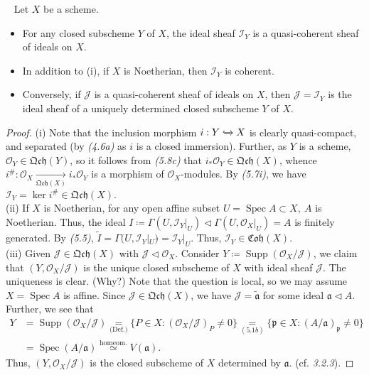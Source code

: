\documentclass[11pt,a4paper,footinclude=true,headinclude=true]{scrbook} %
\DeclareMathOperator{\Supp}{Supp}
\DeclareMathOperator{\Spec}{Spec}
\newcommand{\II}{\mathscr{I}}
\newcommand{\JJ}{\mathscr{J}}
\newcommand{\OO}{\mathcal{O}}
\newcommand{\pp}{\mathfrak{p}}
\newcommand{\<}{\langle}
\newcommand{\>}{\rangle}
\newcommand{\qcoh}{\mathfrak{Qch}}
\newcommand{\coh}{\mathfrak{Coh}}
\newenvironment{proposition}[2][]
{\renewcommand\theinnercustomprop{#2}\innercustomprop[#1] 
\begin{mdframed}[backgroundcolor=gray!20]\ }
{\end{mdframed}\endinnercustomprop}
\begin{document}
\begin{proposition}{5.9}
    Let $X$ be a scheme.
    \begin{itemize}
        \item[(i)] For any closed subscheme $Y$ of $X$, the ideal sheaf $\II_Y$ is a quasi-coherent sheaf of ideals on $X$.
        \item[(ii)] In addition to (i), if $X$ is Noetherian, then $\II_Y$ is coherent.
        \item[(iii)] Conversely, if $\JJ$ is a quasi-coherent sheaf of ideals on $X$, then $\JJ=\II_Y$ is the ideal sheaf of a uniquely determined closed subscheme $Y$ of $X$.
    \end{itemize}
\end{proposition}
\begin{proof}
    (i) Note that the inclusion morphism $i:Y\xhookrightarrow{}X$ is clearly quasi-compact, and separated (by \textit{(4.6a)} as $i$ is a closed immersion). Further, as $Y$ is a scheme, $\OO_Y\in\qcoh(Y)$, so it follows from \textit{(5.8c)} that $i_\ast\OO_Y\in\qcoh(X)$, whence $i^\#:\OO_X\xrightarrow[\qcoh(X)]{}i_\ast\OO_Y$ is a morphism of $\OO_X$-modules. By \textit{(5.7i)}, we have $\II_Y=\ker i^\#\in\qcoh(X)$.\\ \newline
    (ii) If $X$ is Noetherian, for any open affine subset $U=\Spec A\subset X,\ A$ is Noetherian. Thus, the ideal $I\coloneqq\Gamma(U,\II_Y|_U)\triangleleft\Gamma(U,\OO_X|_U)=A$ is finitely generated. By \textit{(5.5)}, $\widetilde{I}=\Gamma(U,\II_Y|_U)\widetilde{}=\II_Y|_U$. Thus, $\II_Y\in\coh(X)$.\\ \newline
    (iii) Given $\JJ\in\qcoh(X)$ with $\JJ\triangleleft\OO_X$. Consider $Y\coloneqq\Supp(\OO_X/\JJ)$, we claim that $(Y,\OO_X/\JJ)$ is the unique closed subscheme of $X$ with ideal sheaf $\JJ$. The uniqueness is clear. (Why?) Note that the question is local, so we may assume $X=\Spec A$ is affine. Since $\JJ\in\qcoh(X)$, we have $\JJ=\widetilde{\mathfrak{a}}$ for some ideal $\mathfrak{a}\triangleleft A$. Further, we see that
    \begin{align*}
        Y &=\Supp(\OO_X/\JJ)\underset{\text{(Def.)}}{=}\{P\in X:(\OO_X/\JJ)_P\neq0\}\underset{(5.1b)}{=}\{\pp\in X:(A/\mathfrak{a})_\pp\neq0\} \\ &=\Spec(A/\mathfrak{a})\overset{\text{homeom.}}{\simeq}V(\mathfrak{a}).
    \end{align*}
    Thus, $(Y,\OO_X/\JJ)$ is the closed subscheme of $X$ determined by $\mathfrak{a}$. (cf. \textit{3.2.3}).
\end{proof}
\end{document}
